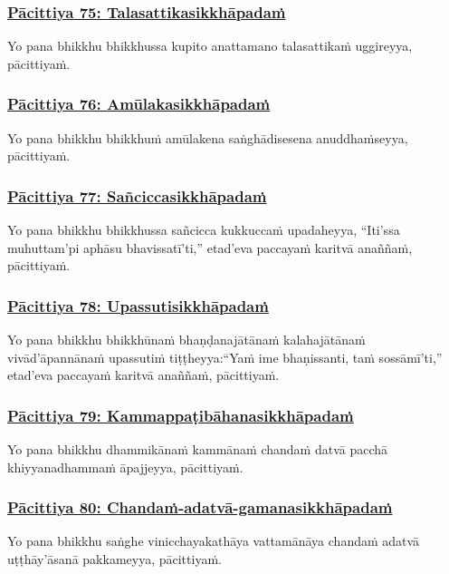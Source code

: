 \subsubsection*{\hyperref[exp75]{Pācittiya 75: Talasattikasikkhāpadaṁ}}
\label{pac75}
Yo pana bhikkhu bhikkhussa kupito anattamano talasattikaṁ uggireyya, pācittiyaṁ.

\subsubsection*{\hyperref[exp76]{Pācittiya 76: Amūlakasikkhāpadaṁ}}
\label{pac76}
Yo pana bhikkhu bhikkhuṁ amūlakena saṅghādisesena anuddhaṁseyya, pācittiyaṁ.

\subsubsection*{\hyperref[exp77]{Pācittiya 77: Sañciccasikkhāpadaṁ}}
\label{pac77}
Yo pana bhikkhu bhikkhussa sañcicca kukkuccaṁ upadaheyya, ``Iti'ssa muhuttam'pi aphāsu bhavissatī'ti,'' etad'eva paccayaṁ karitvā anaññaṁ, pācittiyaṁ.

\subsubsection*{\hyperref[exp78]{Pācittiya 78: Upassutisikkhāpadaṁ}}
\label{pac78}
Yo pana bhikkhu bhikkhūnaṁ bhaṇḍanajātānaṁ kalahajātānaṁ vivād'āpannānaṁ upassutiṁ tiṭṭheyya:``Yaṁ ime bhaṇissanti, taṁ sossāmī'ti,'' etad'eva paccayaṁ karitvā anaññaṁ, pācittiyaṁ.

\subsubsection*{\hyperref[exp79]{Pācittiya 79: Kammappaṭibāhanasikkhāpadaṁ}}
\label{pac79}
Yo pana bhikkhu dhammikānaṁ kammānaṁ chandaṁ datvā pacchā khiyyanadhammaṁ āpajjeyya, pācittiyaṁ.

\subsubsection*{\hyperref[exp80]{Pācittiya 80: Chandaṁ-adatvā-gamanasikkhāpadaṁ}}
\label{pac80}
Yo pana bhikkhu saṅghe vinicchayakathāya vattamānāya chandaṁ adatvā uṭṭhāy'āsanā pakkameyya, pācittiyaṁ.

